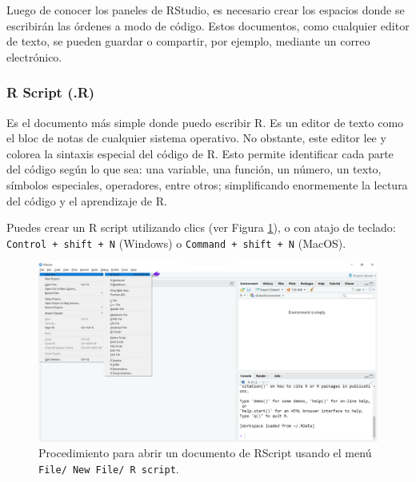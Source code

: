 \documentclass[
]{article}
\theoremstyle{definition}
\theoremstyle{definition}
\theoremstyle{definition}
\theoremstyle{definition}
\theoremstyle{remark}
\begin{document}
Luego de conocer los paneles de RStudio, es necesario crear los espacios donde se escribirán las órdenes a modo de código. Estos documentos, como cualquier editor de texto, se pueden guardar o compartir, por ejemplo, mediante un correo electrónico.

\hypertarget{r-script-.r}{%
\subsubsection{R Script (.R)}\label{r-script-.r}}

Es el documento más simple donde puedo escribir R. Es un editor de texto como el bloc de notas de cualquier sistema operativo. No obstante, este editor lee y colorea la sintaxis especial del código de R. Esto permite identificar cada parte del código según lo que sea: una variable, una función, un número, un texto, símbolos especiales, operadores, entre otros; simplificando enormemente la lectura del código y el aprendizaje de R.

\begin{rmdnote}
Puedes crear un R script utilizando clics (ver Figura \ref{fig:figura21}), o con atajo de teclado: \texttt{Control\ +\ shift\ +\ N} (Windows) o \texttt{Command\ +\ shift\ +\ N} (MacOS).
\end{rmdnote}



\begin{figure}

{\centering \includegraphics[width=1\linewidth]{figs/screenshots/abrir un Rscript} 

}

\caption{Procedimiento para abrir un documento de RScript usando el menú \texttt{File/\ New\ File/\ R\ script}.}\label{fig:figura21}
\end{figure}
\end{document}
